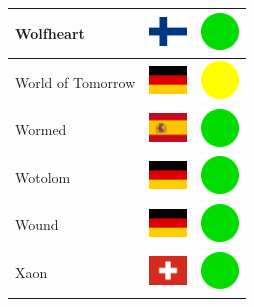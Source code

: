 \documentclass[12pt, a4paper, twoside]{report}
\begin{document}
\begin{center}
\begin{longtable}{|p{5cm}|p{2cm}|p{2cm}|}
 Wolfheart                                                  & \includegraphics[width=1cm]{4x3/fi} &   \includegraphics[width=1cm]{likes/y} \\ \hline
 World of Tomorrow                                          & \includegraphics[width=1cm]{4x3/de} &   \includegraphics[width=1cm]{likes/m} \\ \hline
 Wormed                                                     & \includegraphics[width=1cm]{4x3/es} &   \includegraphics[width=1cm]{likes/y} \\ \hline
 Wotolom                                                    & \includegraphics[width=1cm]{4x3/de} &   \includegraphics[width=1cm]{likes/y} \\ \hline
 Wound                                                      & \includegraphics[width=1cm]{4x3/de} &   \includegraphics[width=1cm]{likes/y} \\ \hline
 Xaon                                                       & \includegraphics[width=1cm]{4x3/ch} &   \includegraphics[width=1cm]{likes/y} \\ \hline

\end{longtable}
\end{center}
\end{document}
